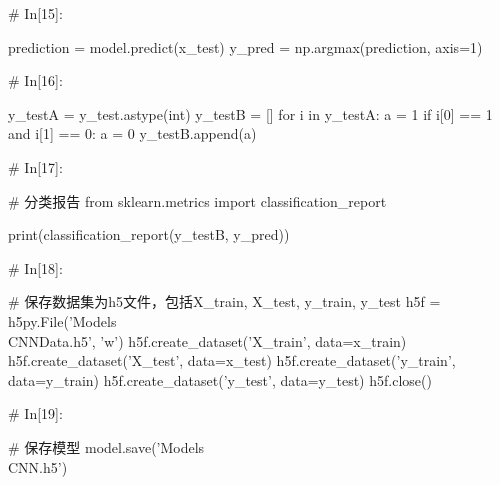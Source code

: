 \documentclass{MathorCupmodeling}
\begin{document}
\begin{python}
# In[15]:


prediction = model.predict(x_test)
y_pred = np.argmax(prediction, axis=1)

# In[16]:


y_testA = y_test.astype(int)
y_testB = []
for i in y_testA:
    a = 1
    if i[0] == 1 and i[1] == 0:
        a = 0
    y_testB.append(a)

# In[17]:


# 分类报告
from sklearn.metrics import classification_report

print(classification_report(y_testB, y_pred))

# In[18]:


# 保存数据集为h5文件，包括X_train, X_test, y_train, y_test
h5f = h5py.File('Models\\CNNData.h5', 'w')
h5f.create_dataset('X_train', data=x_train)
h5f.create_dataset('X_test', data=x_test)
h5f.create_dataset('y_train', data=y_train)
h5f.create_dataset('y_test', data=y_test)
h5f.close()

# In[19]:


# 保存模型
model.save('Models\\CNN.h5')

\end{python}
\end{document}
